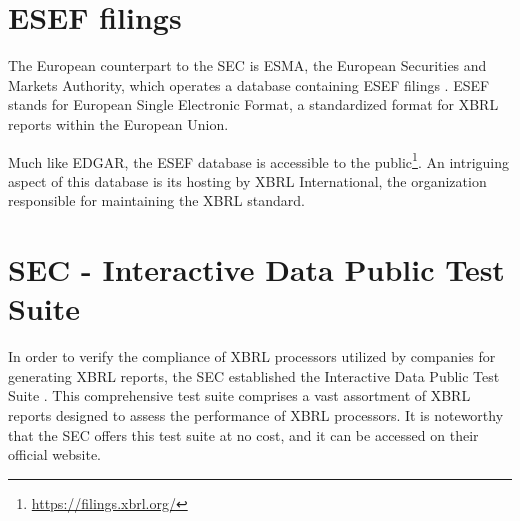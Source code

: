 \section{ESEF filings}
The European counterpart to the SEC is ESMA, 
the European Securities and Markets Authority, 
which operates a database containing ESEF filings \cite{esma_database}. 
ESEF stands for European Single Electronic Format, 
a standardized format for XBRL reports within the European Union.

Much like EDGAR, the ESEF database is accessible to the public\footnote{\url{https://filings.xbrl.org/}}. 
An intriguing aspect of this database is its hosting by XBRL International, the organization responsible for maintaining the XBRL standard.

\section{SEC - Interactive Data Public Test Suite}
\label{sec:idpts}
In order to verify the compliance of XBRL processors utilized by companies for generating XBRL reports, 
the SEC established the Interactive Data Public Test Suite \cite{sec_idpts}. 
This comprehensive test suite comprises a vast assortment of XBRL reports designed to assess the performance of XBRL processors.
It is noteworthy that the SEC offers this test suite at no cost, and it can be accessed on their official website.

